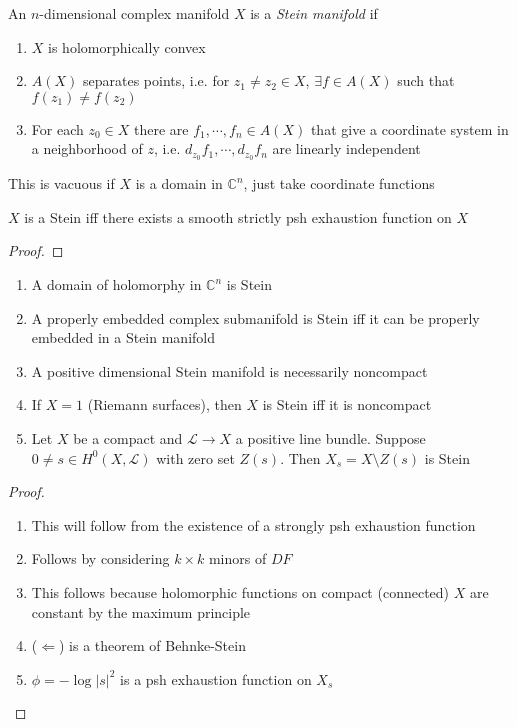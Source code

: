 \documentclass[../main.tex]{subfiles}
\begin{document}
\begin{definition}
An $n$-dimensional complex manifold $X$ is a \textit{Stein manifold} if
\begin{enumerate}
\item $X$ is holomorphically convex
\item $A(X)$ separates points, i.e. for $z_1\neq z_2\in X$, $\exists f\in A(X)$ such that $f(z_1)\neq f(z_2)$
\item For each $z_0\in X$ there are $f_1,\cdots,f_n\in A(X)$ that give a coordinate system in a neighborhood of $z$, i.e. $d_{z_0}f_1,\cdots,d_{z_0}f_n$ are linearly independent
\end{enumerate}
\end{definition}

\begin{note}
This is vacuous if $X$ is a domain in $\mathbb C^n$, just take coordinate functions
\end{note}

\begin{theorem}
$X$ is a Stein iff there exists a smooth strictly psh exhaustion function on $X$
\end{theorem}

\begin{proof}

\end{proof}

\begin{example}
\begin{enumerate}
\item A domain of holomorphy in $\mathbb C^n$ is Stein
\item A properly embedded complex submanifold is Stein iff it can be properly embedded in a Stein manifold
\item A positive dimensional Stein manifold is necessarily noncompact
\item If $X=1$ (Riemann surfaces), then $X$ is Stein iff it is noncompact
\item Let $X$ be a compact and $\mathcal L\to X$ a positive line bundle. Suppose $0\neq s\in H^0(X,\mathcal L)$ with zero set $Z(s)$. Then $X_s=X\setminus Z(s)$ is Stein
\end{enumerate}
\end{example}

\begin{proof}
\begin{enumerate}
\item This will follow from the existence of a strongly psh exhaustion function
\item Follows by considering $k\times k$ minors of $DF$
\item This follows because holomorphic functions on compact (connected) $X$ are constant by the maximum principle
\item ($\Leftarrow$) is a theorem of Behnke-Stein
\item $\phi=-\log|s|^2$ is a psh exhaustion function on $X_s$
\end{enumerate}
\end{proof}
\end{document}
